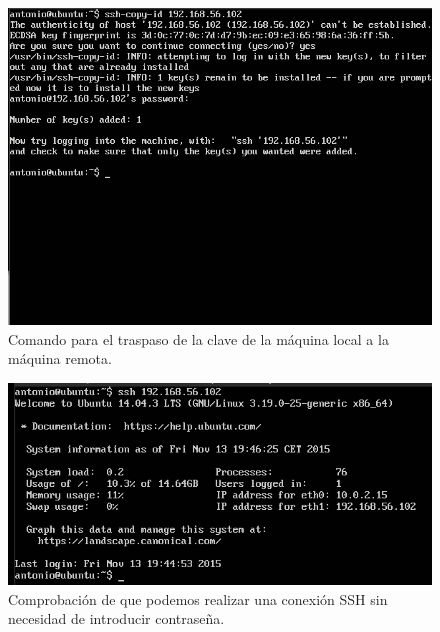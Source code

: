 \begin{figure}[H]
    \begin{center}
        \includegraphics[scale=0.45]{imagenes/img3}
        \caption{Comando para el traspaso de la clave de la máquina local a la máquina remota.}
        \label{fig3}
    \end{center}
\end{figure}

\begin{figure}[H]
    \begin{center}
        \includegraphics[scale=0.5]{imagenes/img4}
        \caption{Comprobación de que podemos realizar una conexión SSH sin necesidad de introducir contraseña.}
        \label{fig4}
    \end{center}
\end{figure}








